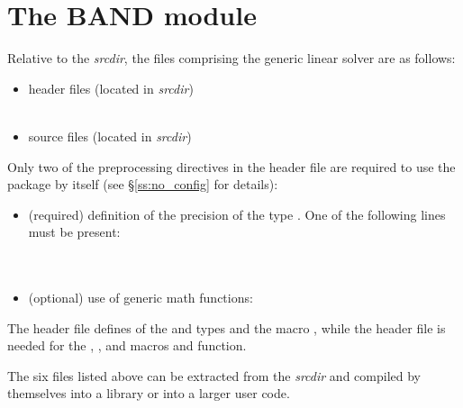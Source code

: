 
\section{The BAND module}\label{ss:band}

Relative to the {\sundials} {\em srcdir}, the files comprising the
{\band} generic linear solver are as follows:
\begin{itemize}
\item header files (located in {\em srcdir})\\
   \\
     
\item source files (located in {\em srcdir})\\
   
\end{itemize}
Only two of the preprocessing directives in the header file  
are required to use the {\band} package by itself (see \S\ref{ss:no_config} for details):
\begin{itemize}
\item (required) definition of the precision of the {\sundials} type . 
  One of the following lines must be present:\\
  \\
  \\
\item (optional) use of generic math functions:\\
\end{itemize}
The  header file defines of the {\sundials}
 and  types and the macro , while the 
 header file is needed for the , , and  macros 
and  function.

The six files listed above can be extracted from the {\sundials} {\em srcdir} and
compiled by themselves into a {\band} library or into a larger user code.

